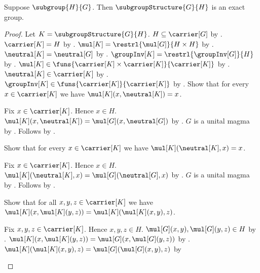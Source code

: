 \begin{theorem}\label{subgroup_structure_is_exact_group}
    Suppose $\subgroup{H}{G}$.
    Then $\subgroupStructure{G}{H}$ is an exact group.
\end{theorem}
\begin{proof}
    Let $K=\subgroupStructure{G}{H}$.
    $H\subseteq\carrier[G]$ by .
    $\carrier[K]=H$ by .
    $\mul[K]=\restrl{\mul[G]}{H\times H}$ by
        .
    $\neutral[K]=\neutral[G]$ by
        .
    $\groupInv[K]=\restrl{\groupInv[G]}{H}$ by
        .
    $\mul[K]\in\funs{\carrier[K]\times\carrier[K]}{\carrier[K]}$ by
        .
    $\neutral[K]\in\carrier[K]$ by .
    $\groupInv[K]\in\funs{\carrier[K]}{\carrier[K]}$ by
        .
    Show that for every $x\in\carrier[K]$ we have
        $\mul[K](x,\neutral[K])=x$.
    \begin{subproof}
        Fix $x\in\carrier[K]$.
        Hence $x\in H$.
        $\mul[K](x,\neutral[K])
            =\mul[G](x,\neutral[G])$ by
            .
        $G$ is a unital magma by
            .
        Follows by .
    \end{subproof}
    Show that for every $x\in\carrier[K]$ we have
        $\mul[K](\neutral[K],x)=x$.
    \begin{subproof}
        Fix $x\in\carrier[K]$.
        Hence $x\in H$.
        $\mul[K](\neutral[K],x)
            =\mul[G](\neutral[G],x)$ by
            .
        $G$ is a unital magma by
            .
        Follows by .
    \end{subproof}
    Show that for all $x,y,z\in\carrier[K]$ we have
        $\mul[K](x,\mul[K](y,z))
            =\mul[K](\mul[K](x,y),z)$.
    \begin{subproof}
        Fix $x,y,z\in\carrier[K]$.
        Hence $x,y,z\in H$.
        $\mul[G](x,y),\mul[G](y,z)\in H$ by
            .
        $\mul[K](x,\mul[K](y,z))
            =\mul[G](x,\mul[G](y,z))$ by
            .
        $\mul[K](\mul[K](x,y),z)
            =\mul[G](\mul[G](x,y),z)$ by

\end{subproof}
\end{proof}
